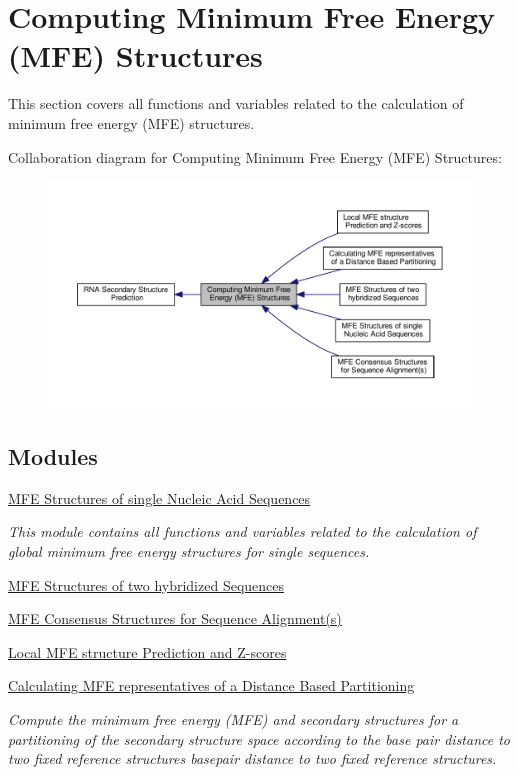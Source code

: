 \hypertarget{group__mfe__fold}{\section{Computing Minimum Free Energy (M\+F\+E) Structures}
\label{group__mfe__fold}
}


This section covers all functions and variables related to the calculation of minimum free energy (M\+F\+E) structures.  


Collaboration diagram for Computing Minimum Free Energy (M\+F\+E) Structures\+:
\nopagebreak
\begin{figure}[H]
\begin{center}
\leavevmode
\includegraphics[width=350pt]{group__mfe__fold}
\end{center}
\end{figure}
\subsection*{Modules}
\begin{DoxyCompactItemize}
\item 
\hyperlink{group__mfe__fold__single}{M\+F\+E Structures of single Nucleic Acid Sequences}
\begin{DoxyCompactList}\small\item\em This module contains all functions and variables related to the calculation of global minimum free energy structures for single sequences. \end{DoxyCompactList}\item 
\hyperlink{group__mfe__cofold}{M\+F\+E Structures of two hybridized Sequences}
\item 
\hyperlink{group__consensus__mfe__fold}{M\+F\+E Consensus Structures for Sequence Alignment(s)}
\item 
\hyperlink{group__local__mfe__fold}{Local M\+F\+E structure Prediction and Z-\/scores}
\item 
\hyperlink{group__kl__neighborhood__mfe}{Calculating M\+F\+E representatives of a Distance Based Partitioning}
\begin{DoxyCompactList}\small\item\em Compute the minimum free energy (M\+F\+E) and secondary structures for a partitioning of the secondary structure space according to the base pair distance to two fixed reference structures basepair distance to two fixed reference structures. \end{DoxyCompactList}\end{DoxyCompactItemize}
